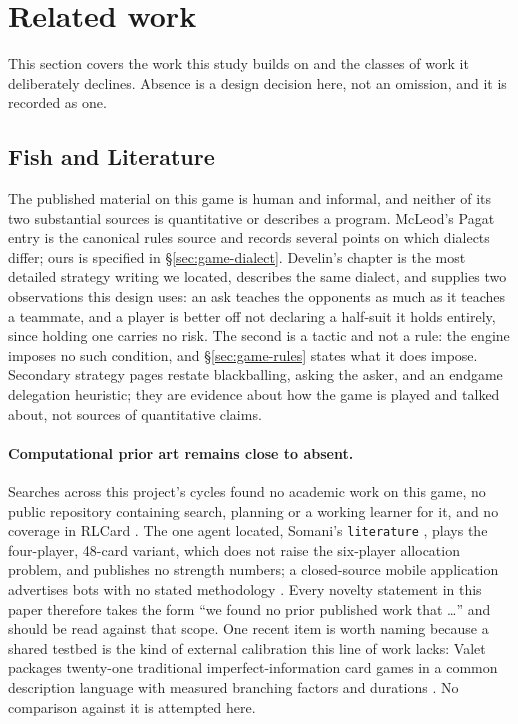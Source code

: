 \section{Related work}
\label{sec:related}

This section covers the work this study builds on and the classes of work it deliberately declines.
Absence is a design decision here, not an omission, and it is recorded as one.

\subsection{Fish and Literature}
\label{sec:related-fish}

The published material on this game is human and informal, and neither of its two substantial
sources is quantitative or describes a program. McLeod's Pagat entry \cite{pagat} is the canonical
rules source and records several points on which dialects differ; ours is specified in
\S\ref{sec:game-dialect}. Develin's chapter \cite{develin} is the most detailed strategy writing we
located, describes the same dialect, and supplies two observations this design uses: an ask teaches
the opponents as much as it teaches a teammate, and a player is better off not declaring a half-suit
it holds entirely, since holding one carries no risk. The second is a tactic and not a rule: the
engine imposes no such condition, and \S\ref{sec:game-rules} states what it does impose. Secondary strategy pages \cite{dorsa,strategy-site,wikiliterature} restate blackballing,
asking the asker, and an endgame delegation heuristic; they are evidence about how the game is
played and talked about, not sources of quantitative claims.

\paragraph{Computational prior art remains close to absent.} Searches across this project's cycles
found no academic work on this game, no public repository containing search, planning or a working
learner for it, and no coverage in RLCard \cite{rlcard}. The one agent located, Somani's
\texttt{literature} \cite{somani,somani-server}, plays the four-player, 48-card variant, which does
not raise the six-player allocation problem, and publishes no strength numbers; a closed-source
mobile application advertises bots with no stated methodology \cite{playstore}. Every novelty
statement in this paper therefore takes the form ``we found no prior published work that \ldots{}''
and should be read against that scope. One recent item is worth naming because a shared testbed is the kind of external calibration this
line of work lacks: Valet packages twenty-one traditional imperfect-information card games in a
common description language with measured branching factors and durations
\cite{goadrich2026valet}. No comparison against it is attempted here.

